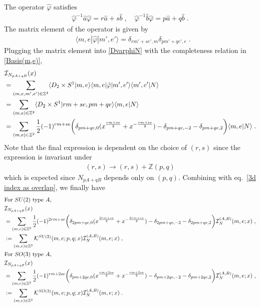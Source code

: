 \documentclass[a4paper,11pt]{article}
\def\cI{\mathcal{I}}
\begin{document}
% 
The operator $\hat{\varphi}$ satisfies
%
\begin{align}
 \hat{\varphi}^{-1}\hat{a} \hat{\varphi} = r \hat{a}+ s \hat{b}\;,\quad  \hat{\varphi}^{-1}\hat{b}\hat{\varphi} = p \hat{a}+ q \hat{b}\;.
\end{align}
%
The matrix element of the operator is given by 
%
\begin{align}
&\langle m, e | \hat{\varphi} | m', e'\rangle =\delta_{r m' +s e' , m}\delta_{p m' + q e' , e}\;.
\end{align}
%
Plugging the matrix element into \eqref{DvarphiN} with the completeness relation in \eqref{Basis(m,e)},
%
\begin{align}
\begin{split}
&\cI_{N_{pA+qB}}(x) 
\\
&= \sum_{(m, e, m', e')\in \mathbb{Z}^4}\langle D_2 \times S^1 | m, e \rangle \langle m, e |\hat{\varphi} | m',e' \rangle \langle m', e'|N \rangle
\\
&= \sum_{(m, e)\in \mathbb{Z}^2} \langle D_2\times S^1 | r m+ s e, p m+q e \rangle \langle m, e |N \rangle
\\
&= \sum_{(m, e)\in \mathbb{Z}^2} \frac{1}2 (-1)^{r m+ s e} \bigg{(} \delta_{p m+q e,0} (x^{\frac{r m+s e}2}+ x^{-\frac{r m+s e}2}) - \delta_{p m+qe,-2}-\delta_{p m+q e,2} \bigg{)}   \langle m, e |N\rangle\;.
\end{split}
\end{align}
%
Note that the final expression is dependent on the choice of $(r,s)$ since the expression is invariant under 
%
\begin{align}
(r,s) \rightarrow (r,s)+ \mathbb{Z}(p,q)
\end{align}
%
which is expected since $N_{pA+qB}$ depends only on $(p,q)$.
%
Combining with eq.~\eqref{3d index as overlap}, we finally have
%
\begin{align}
\begin{split}
&\textrm{For $SU(2)$ type $A$,}
\\
&\cI_{N_{pA+qB}}(x)  
\\
&= \sum_{(m, e)\in \mathbb{Z}^2} \frac{1}2 (-1)^{2r m+ s e} \bigg{(} \delta_{2p m+q e,0} (x^{\frac{2r m+s e}2}+ x^{-\frac{2r m+s e}2}) - \delta_{2p m+qe,-2}-\delta_{2p m+q e,2} \bigg{)}   \cI^{(A,B)}_{N}(m,e;x)\;,
\\
&:=\sum_{(m,e)\in \mathbb{Z}^2} \mathcal{K}^{SU(2)}(m,e;p,q;x)\mathcal{I}^{(A,B)}_N(m,e;x)\;,
\\
&\textrm{For $SO(3)$ type $A$,}
\\
&\cI_{N_{pA+qB}}(x)  
\\
&= \sum_{(m, e)\in \mathbb{Z}^2} \frac{1}2 (-1)^{r m+ 2s e} \bigg{(} \delta_{p m+2q e,0} (x^{\frac{r m+2s e}2}+ x^{-\frac{r m+2s e}2}) - \delta_{p m+2qe,-2}-\delta_{p m+2q e,2} \bigg{)}   \cI^{(A,B)}_{N}(m,e;x)\;,
\\
&:=\sum_{(m,e)\in \mathbb{Z}^2} \mathcal{K}^{SO(3)}(m,e;p,q;x)\mathcal{I}^{(A,B)}_N(m,e;x)\;.
 \label{3d index-2}
\end{split}
\end{align}
\end{document}
